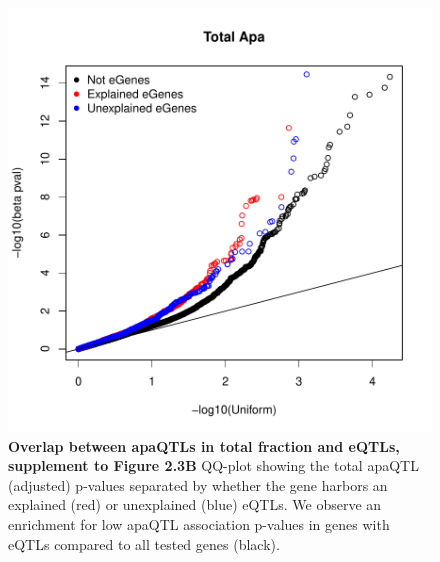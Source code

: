 \begin{figure}[!htb]
\centering
\includegraphics[width=5in]{img/ch02/Fig3_figuresupplement2.pdf}
\caption[Overlap between apaQTLs in total fraction and eQTLs, supplement to Figure 2.3B]{\textbf{Overlap between apaQTLs in total fraction and eQTLs, supplement to Figure 2.3B} QQ-plot showing the total apaQTL (adjusted) p-values separated by whether the gene harbors an explained (red) or unexplained (blue) eQTLs. We observe an enrichment for low apaQTL association p-values in genes with eQTLs compared to all tested genes (black). }
\label{fig:totunexp}
\end{figure}
\clearpage

